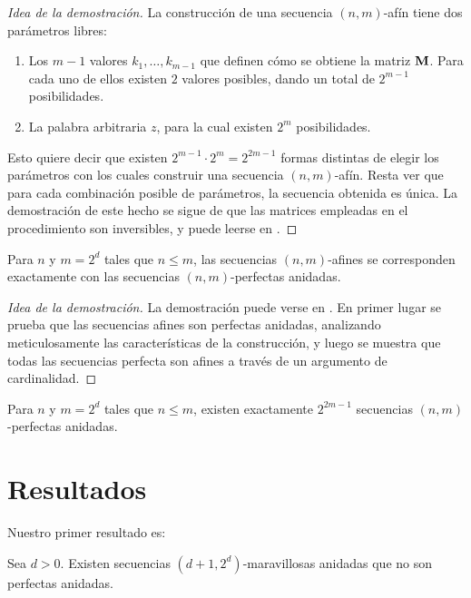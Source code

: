 \documentclass[11pt]{article}
\begin{document}
\begin{proof}[Idea de la demostración]
	La construcción de una secuencia $(n,m)$-afín tiene dos parámetros libres:
	\begin{enumerate}
		\item Los $m - 1$ valores $k_1,\dots,k_{m - 1}$ que definen cómo se
		      obtiene la matriz $\mathbf{M}$. Para cada uno de ellos existen $2$
		      valores posibles, dando un total de $2^{m - 1}$ posibilidades.
		\item La palabra arbitraria $z$, para la cual existen $2^m$
		      posibilidades.
	\end{enumerate}
	Esto quiere decir que existen $2^{m - 1}\cdot2^m = 2^{2m - 1}$
	formas distintas de elegir los parámetros con los cuales construir una
	secuencia $(n,m)$-afín. Resta ver que para cada combinación posible de
	parámetros, la secuencia obtenida es única. La demostración de este hecho se
	sigue de que las matrices empleadas en el procedimiento son inversibles,
	y puede leerse en \cite{becher-nested-perfect}.
\end{proof}

\begin{theorem}
	Para $n$ y $m = 2^d$ tales que $n \leq m$, las secuencias $(n,m)$-afines se
	corresponden exactamente con las secuencias $(n,m)$-perfectas anidadas.
\end{theorem}

\begin{proof}[Idea de la demostración]
	La demostración puede verse en \cite{becher-nested-perfect}. En primer lugar se
	prueba que las secuencias afines son perfectas anidadas, analizando
	meticulosamente las características de la construcción, y luego se muestra
	que todas las secuencias perfecta son afines a través de un argumento de
	cardinalidad.
\end{proof}

\begin{corollary}
	Para $n$ y $m = 2^d$ tales que $n \leq m$, existen exactamente $2^{2m - 1}$
	secuencias $(n,m)$-perfectas anidadas.
\end{corollary}

\section{Resultados}

Nuestro primer resultado es:

\begin{theorem}
	\label{teo:existencia}
	Sea $d > 0$. Existen secuencias $(d + 1, 2^d)$-maravillosas anidadas que no son perfectas anidadas.
\end{theorem}
\end{document}
